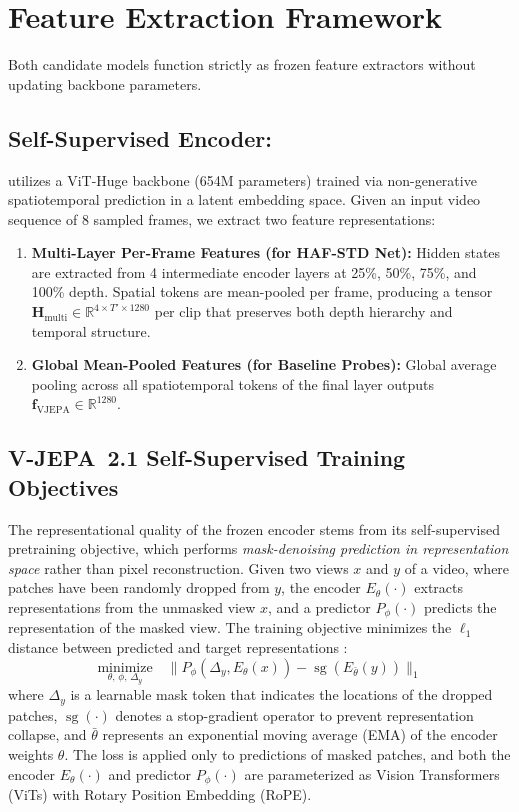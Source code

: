 \section{Feature Extraction Framework}

Both candidate models function strictly as frozen feature extractors without updating backbone parameters.

\subsection{Self-Supervised Encoder: \vjepaa{}}
\vjepaa{} \citep{assran2025vjepa2} utilizes a ViT-Huge backbone (654M parameters) trained via non-generative spatiotemporal prediction in a latent embedding space. Given an input video sequence of 8 sampled frames, we extract two feature representations:
\begin{enumerate}[leftmargin=*]
    \item \textbf{Multi-Layer Per-Frame Features (for HAF-STD Net):} Hidden states are extracted from 4 intermediate encoder layers at 25\%, 50\%, 75\%, and 100\% depth. Spatial tokens are mean-pooled per frame, producing a tensor $\mathbf{H}_{\text{multi}} \in \mathbb{R}^{4 \times T' \times 1280}$ per clip that preserves both depth hierarchy and temporal structure.
    \item \textbf{Global Mean-Pooled Features (for Baseline Probes):} Global average pooling across all spatiotemporal tokens of the final layer outputs $\mathbf{f}_{\text{VJEPA}} \in \mathbb{R}^{1280}$.
\end{enumerate}

\subsection{V-JEPA~2.1 Self-Supervised Training Objectives}

The representational quality of the frozen \vjepaa{} encoder stems from its self-supervised pretraining objective, which performs \emph{mask-denoising prediction in representation space} rather than pixel reconstruction. Given two views $x$ and $y$ of a video, where patches have been randomly dropped from $y$, the encoder $E_\theta(\cdot)$ extracts representations from the unmasked view $x$, and a predictor $P_\phi(\cdot)$ predicts the representation of the masked view. The training objective minimizes the $\ell_1$ distance between predicted and target representations \citep{assran2025vjepa2}:
\begin{equation*}
    \underset{\theta,\,\phi,\,\Delta_y}{\text{minimize}} \quad \|P_\phi(\Delta_y, E_\theta(x)) - \operatorname{sg}(E_{\bar{\theta}}(y))\|_1
\end{equation*}
where $\Delta_y$ is a learnable mask token that indicates the locations of the dropped patches, $\operatorname{sg}(\cdot)$ denotes a stop-gradient operator to prevent representation collapse, and $\bar{\theta}$ represents an exponential moving average (EMA) of the encoder weights $\theta$. The loss is applied only to predictions of masked patches, and both the encoder $E_\theta(\cdot)$ and predictor $P_\phi(\cdot)$ are parameterized as Vision Transformers (ViTs) with Rotary Position Embedding (RoPE).

